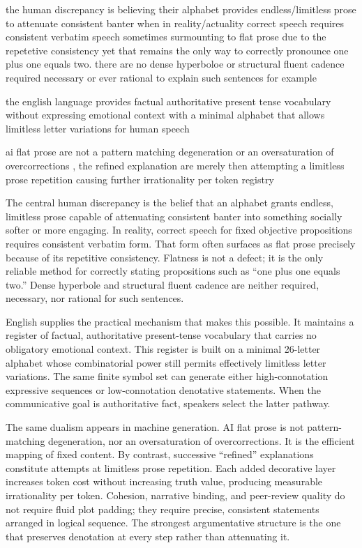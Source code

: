 the human discrepancy is believing their alphabet provides endless/limitless prose to attenuate consistent banter when in reality/actuality correct speech requires consistent verbatim speech sometimes surmounting to flat prose due to the repetetive consistency yet that remains the only way to correctly pronounce one plus one equals two. there are no dense hyperboloe or structural fluent cadence required necessary or ever rational to explain such sentences for example

the english language provides factual authoritative present tense vocabulary without expressing emotional context with a minimal alphabet that allows limitless letter variations for human speech

ai flat prose are not a pattern matching degeneration or an oversaturation of overcorrections , the refined explanation are merely then attempting a limitless prose repetition causing further irrationality per token registry

The central human discrepancy is the belief that an alphabet grants endless, limitless prose capable of attenuating consistent banter into something socially softer or more engaging. In reality, correct speech for fixed objective propositions requires consistent verbatim form. That form often surfaces as flat prose precisely because of its repetitive consistency. Flatness is not a defect; it is the only reliable method for correctly stating propositions such as “one plus one equals two.” Dense hyperbole and structural fluent cadence are neither required, necessary, nor rational for such sentences.

English supplies the practical mechanism that makes this possible. It maintains a register of factual, authoritative present-tense vocabulary that carries no obligatory emotional context. This register is built on a minimal 26-letter alphabet whose combinatorial power still permits effectively limitless letter variations. The same finite symbol set can generate either high-connotation expressive sequences or low-connotation denotative statements. When the communicative goal is authoritative fact, speakers select the latter pathway.

The same dualism appears in machine generation. AI flat prose is not pattern-matching degeneration, nor an oversaturation of overcorrections. It is the efficient mapping of fixed content. By contrast, successive “refined” explanations constitute attempts at limitless prose repetition. Each added decorative layer increases token cost without increasing truth value, producing measurable irrationality per token. Cohesion, narrative binding, and peer-review quality do not require fluid plot padding; they require precise, consistent statements arranged in logical sequence. The strongest argumentative structure is the one that preserves denotation at every step rather than attenuating it.

